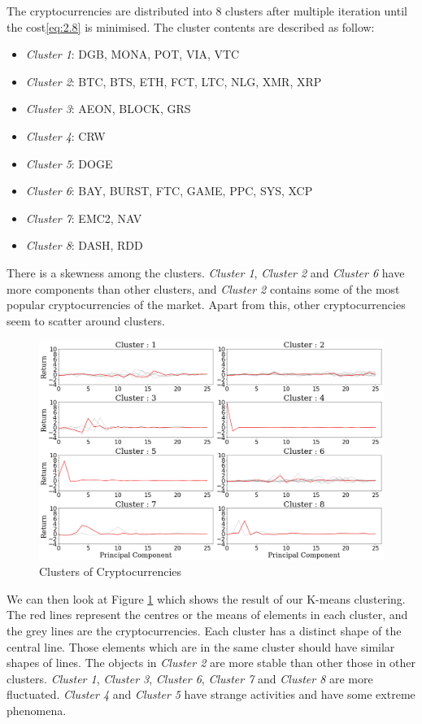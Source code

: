 \documentclass[11pt]{article} %
\theoremstyle{plain}
\theoremstyle{definition}
\begin{document}
The cryptocurrencies are distributed into 8 clusters after multiple iteration until the cost\eqref{eq:2.8} is minimised. The cluster contents are described as follow:
\begin{itemize}
    \item \textsl{Cluster 1}: DGB, MONA, POT, VIA, VTC
    \item \textsl{Cluster 2}: BTC, BTS, ETH, FCT, LTC, NLG, XMR, XRP
    \item \textsl{Cluster 3}: AEON, BLOCK, GRS
    \item \textsl{Cluster 4}: CRW
    \item \textsl{Cluster 5}: DOGE
    \item \textsl{Cluster 6}: BAY, BURST, FTC, GAME, PPC, SYS, XCP
    \item \textsl{Cluster 7}: EMC2, NAV
    \item \textsl{Cluster 8}: DASH, RDD
\end{itemize}

There is a skewness among the clusters. \textsl{Cluster 1}, \textsl{Cluster 2} and \textsl{Cluster 6} have more components than other clusters, and \textsl{Cluster 2} contains some of the most popular cryptocurrencies of the market. Apart from this, other cryptocurrencies seem to scatter around clusters.

\begin{figure}[ht]
    \includegraphics[width=1\linewidth, center]{resources/crypto_kmeans.png}
    \caption{Clusters of Cryptocurrencies}
    \label{fig:cryptokmeans}
\end{figure}

We can then look at Figure \ref{fig:cryptokmeans} which shows the result of our K-means clustering. The red lines represent the centres or the means of elements in each cluster, and the grey lines are the cryptocurrencies. Each cluster has a distinct shape of the central line. Those elements which are in the same cluster should have similar shapes of lines. The objects in \textsl{Cluster 2} are more stable than other those in other clusters. \textsl{Cluster 1}, \textsl{Cluster 3}, \textsl{Cluster 6}, \textsl{Cluster 7} and \textsl{Cluster 8} are more fluctuated. \textsl{Cluster 4} and \textsl{Cluster 5} have strange activities and have some extreme phenomena.
\end{document}
